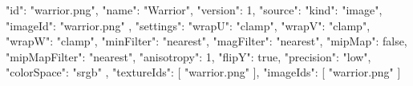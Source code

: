 {
  "id": "warrior.png",
  "name": "Warrior",
  "version": 1,
  "source": {
    "kind": "image",
    "imageId": "warrior.png"
  },
  "settings": {
    "wrapU": "clamp",
    "wrapV": "clamp",
    "wrapW": "clamp",
    "minFilter": "nearest",
    "magFilter": "nearest",
    "mipMap": false,
    "mipMapFilter": "nearest",
    "anisotropy": 1,
    "flipY": true,
    "precision": "low",
    "colorSpace": "srgb"
  },
  "textureIds": [
    "warrior.png"
  ],
  "imageIds": [
    "warrior.png"
  ]
}
